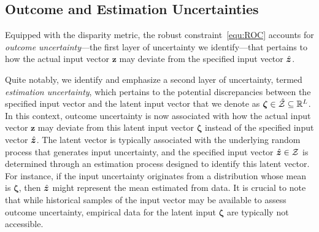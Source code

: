 \documentclass[mnsc, nonblindrev]{informswp}
\newcommand{\1}[1]{\mathds{1}{\left(#1\right)}}
\begin{document}

\subsection*{Outcome and Estimation Uncertainties}

Equipped with the disparity metric, the robust constraint~\eqref{equ:ROC} accounts for \textit{outcome uncertainty}---the first layer of uncertainty we identify---that pertains to how the actual input vector $\bm z$ may deviate from the specified input vector $\hat{\bm{z}}$.

Quite notably, we identify and emphasize a second layer of uncertainty, termed \textit{estimation uncertainty}, which pertains to the potential discrepancies between the specified input vector and the latent input vector that we denote as $\bm{\zeta} \in \hat{\mathcal{Z}} \subseteq \mathbb{R}^L$. In this context, outcome uncertainty is now associated with how the actual input vector $\bm z$ may deviate from this latent input vector $\bm{\zeta}$ instead of the specified input vector $\hat{\bm{z}}$. The latent vector is typically associated with the underlying random process that generates input uncertainty, and the specified input vector $\hat{\bm{z}} \in \mathcal{Z}$ is determined through an estimation process designed to identify this latent vector. For instance, if the input uncertainty originates from a distribution whose mean is $\bm \zeta$, then $\hat{\bm{z}}$ might represent the mean estimated from data. It is crucial to note that while historical samples of the input vector may be available to assess outcome uncertainty, empirical data for the latent input $\bm \zeta$ are typically not accessible.
\end{document}
